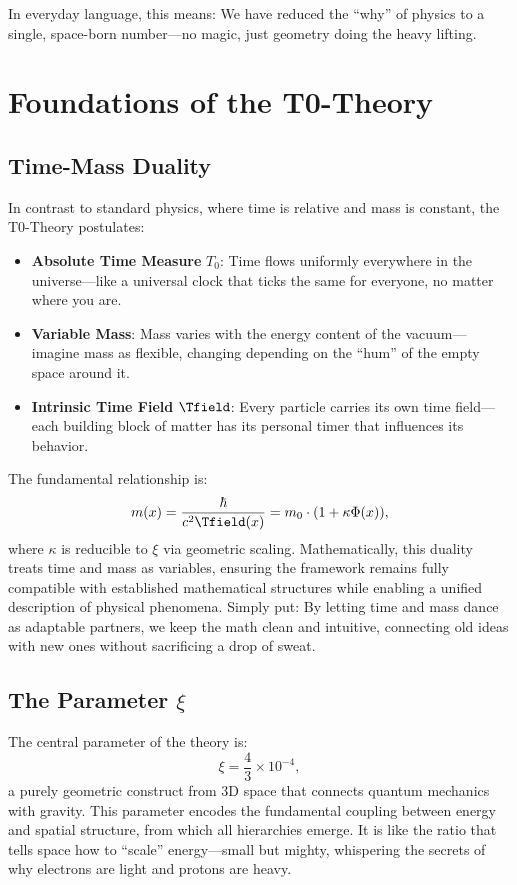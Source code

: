 	In everyday language, this means: We have reduced the ``why'' of physics to a single, space-born number—no magic, just geometry doing the heavy lifting.
	
	\section{Foundations of the T0-Theory}
	
	\subsection{Time-Mass Duality}
	In contrast to standard physics, where time is relative and mass is constant, the T0-Theory postulates:
	\begin{itemize}
		\item \textbf{Absolute Time Measure} $T_0$: Time flows uniformly everywhere in the universe—like a universal clock that ticks the same for everyone, no matter where you are.
		\item \textbf{Variable Mass}: Mass varies with the energy content of the vacuum—imagine mass as flexible, changing depending on the ``hum'' of the empty space around it.
		\item \textbf{Intrinsic Time Field} $\Tfield$: Every particle carries its own time field—each building block of matter has its personal timer that influences its behavior.
	\end{itemize}
	
	The fundamental relationship is:
	\[
	m(x) = \frac{\hbar}{c^2 \Tfield(x)} = m_0 \cdot (1 + \kappa \Phi(x)),
	\]
	where $\kappa$ is reducible to $\xi$ via geometric scaling. Mathematically, this duality treats time and mass as variables, ensuring the framework remains fully compatible with established mathematical structures while enabling a unified description of physical phenomena. Simply put: By letting time and mass dance as adaptable partners, we keep the math clean and intuitive, connecting old ideas with new ones without sacrificing a drop of sweat.
	
	\subsection{The Parameter $\xi$}
	The central parameter of the theory is:
	\[
	\xi = \frac{4}{3} \times 10^{-4},
	\]
	a purely geometric construct from 3D space that connects quantum mechanics with gravity. This parameter encodes the fundamental coupling between energy and spatial structure, from which all hierarchies emerge. It is like the ratio that tells space how to ``scale'' energy—small but mighty, whispering the secrets of why electrons are light and protons are heavy.
	
